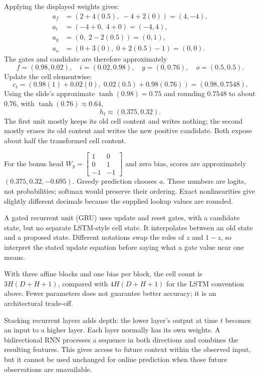 \documentclass[11pt]{article}
\begin{document}
Applying the displayed weights gives:
\[
\begin{aligned}
a_f&=(2+4(0.5),\;-4+2(0))=(4,-4),\\
a_i&=(-4+0,\;4+0)=(-4,4),\\
a_g&=(0,\;2-2(0.5))=(0,1),\\
a_o&=(0+3(0),\;0+2(0.5)-1)=(0,0).
\end{aligned}
\]
The gates and candidate are therefore approximately
\[
f=(0.98,0.02),\quad i=(0.02,0.98),\quad
g=(0,0.76),\quad o=(0.5,0.5).
\]
Update the cell elementwise:
\[
c_t=(0.98(1)+0.02(0),\;0.02(0.5)+0.98(0.76))
     =(0.98,0.7548).
\]
Using the slide's approximate $\tanh(0.98)=0.75$ and rounding $0.7548$ to about $0.76$, with $\tanh(0.76)\approx0.64$,
\[
h_t\approx(0.375,0.32).
\]
The first unit mostly keeps its old cell content and writes nothing; the second mostly erases its old content and writes the new positive candidate. Both expose about half the transformed cell content.

For the bonus head
$W_y=\left[\begin{smallmatrix}1&0\\0&1\\-1&-1\end{smallmatrix}\right]$
and zero bias, scores are approximately $(0.375,0.32,-0.695)$. Greedy prediction chooses $a$. These numbers are logits, not probabilities; softmax would preserve their ordering. Exact nonlinearities give slightly different decimals because the supplied lookup values are rounded.

A gated recurrent unit (GRU) uses update and reset gates, with a candidate state, but no separate LSTM-style cell state. It interpolates between an old state and a proposed state. Different notations swap the roles of $z$ and $1-z$, so interpret the stated update equation before saying what a gate value near one means.

With three affine blocks and one bias per block, the cell count is $3H(D+H+1)$, compared with $4H(D+H+1)$ for the LSTM convention above. Fewer parameters does not guarantee better accuracy; it is an architectural trade-off.

Stacking recurrent layers adds depth: the lower layer's output at time $t$ becomes an input to a higher layer. Each layer normally has its own weights. A bidirectional RNN processes a sequence in both directions and combines the resulting features. This gives access to future context within the observed input, but it cannot be used unchanged for online prediction when those future observations are unavailable.
\end{document}
